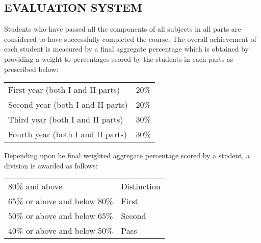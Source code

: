 \subsection{\uppercase{Evaluation System}}
Students who have passed all the components of all subjects in all parts are considered to have successfully completed the course. The overall achievement of each student is measured by a final aggregate percentage which is obtained by providing a weight to percentages scored by the students in each parts as prescribed below:

\par
\noindent

\begin{table}[h]
    
    \begin{tabular}{l c}
    
        First year (both I and II parts) & 20\% \\
        Second year (both I and II parts) & 20\% \\
        Third year (both I and II parts) & 30\% \\
        Fourth year (both I and II parts) & 30\% \\
    \end{tabular}
\end{table}
\par
\noindent
Depending upon he final weighted aggregate percentage scored by a student, a division is awarded as follows:

\begin{table}[h]
    
    \begin{tabular}{l l}
    
        80\% and above & Distinction \\
        65\% or above and below 80\% & First \\
        50\% or above and below 65\% & Second \\
        40\% or above and below 50\% & Pass \\
    \end{tabular}
\end{table}
